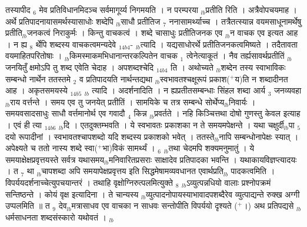 \documentclass[article,12pt,a4paper]{memoir}%
\newcommand{\add}[1]{($^{+}$#1)}
\newcounter{parCount}
\begin{document}
	  
	  \pstart \leavevmode%
	तस्यापीद {\tiny $_{6}$} मेव प्रतिविधानमिदञ्च सर्वमागूर्य्य निगमयति । न {\color{DodgerBlue3}परम्परया {\tiny $_{lb}$}प्रतीति} रिति । अत्रैवोपचयमाह । अर्थे प्रतिपादनायासमर्थस्यासाधोः शब्देपि {\tiny $_{lb}$}साधौ प्रतीतिज {\tiny $_{7}$} ननासामर्थ्याच्च । तत्रैतत्स्यान्न वयमसाधूनामर्थेषु प्रतीति{\tiny $_{lb}$}जनकत्वं निराकुर्मः । किन्तु वाचकत्वं । शब्दे चासाधुः प्रतीतिजनक एव {\tiny $_{lb}$}न वाचक एव इत्यत आह । न {\color{DodgerBlue3}ह्य {\tiny $_{8}$} \leavevmode{} र्थेपि शब्दस्य वाचकत्वमन्यदेवे} {\tiny $_{14b4}$}- {\tiny $_{lb}$}त्यादि । यद्यसाधोरर्थे प्रतीतिजनकत्वमिष्यते । तदैतावता वयमाहितपरितोषाः । {\tiny $_{lb}$}किमस्माकमभिधानान्तरकल्पितेन वाचक {\tiny $_{1}$} त्वेनेत्याकूतं । नैव तर्ह्यसावर्थप्रतीतिं {\tiny $_{lb}$}जनयितुँ क्षमोऽपि तु शब्द एवेति चेदाह । {\color{DodgerBlue3}अपशब्दश्चेदि {\tiny $_{14b4}$} ति} । अथोच्यते {\tiny $_{lb}$}शब्देन तस्य स्वाभाविकः सम्बन्धो नार्थेन ततस्तमे {\tiny $_{2}$} व प्रतिपादयति नार्थन्तद्यथा {\tiny $_{lb}$}स्वभावतश्चक्षूरूपं प्रकाश\add{य}ति न शब्दादीनत आह । {\color{DodgerBlue3}अकृतसमयस्ये {\tiny $_{14b5}$} {\tiny $_{lb}$} त्यादि} । अदर्शनादिति । न ह्यप्रतीतसम्बन्धाः {\color{DodgerBlue3}सिंहल} शब्दा आर्य {\tiny $_{3}$} जनव्यवहा{\tiny $_{lb}$}राय वर्त्तन्ते । समय एव तु जनयेत् प्रतीतिं । सामयिके च तत्र सम्बन्धे सोर्थेप्य{\tiny $_{lb}$}निवार्यः । समयवसादसाधुः साधौ वर्त्तमानोर्थ एव गवादौ {\tiny $_{4}$} किन्न {\tiny $_{lb}$}प्रवर्तते । नहि किञ्चित्तथा दोषो गुणस्तु केवल इत्याह । {\color{DodgerBlue3}एवं ही} त्या {\tiny $_{14b6}$} {\tiny $_{lb}$}दि । एतदुक्तम्भवति । ये स्वभावतः प्रकाशका न ते समयमपेक्षन्ते । यथा चक्षुर्दी{\tiny $_{lb}$}पा {\tiny $_{5}$} दयो रूपादीनां । स्वभावतश्चापशब्दो यदि शब्दस्य प्रकाशको भवेत् । ततस्ते{\tiny $_{lb}$}नापि सम्बन्धोनापेक्षः स्यात् । अपेक्ष्यते च ततो नास्य शब्दे स्वा\add{भा}विकं सामर्थ्यं । {\tiny $_{6}$} {\tiny $_{lb}$}तथा चेदमपि शक्यमनुमातुं । ये समयाक्षेक्षप्रवृत्तयस्ते सर्वत्र यथासमय{\tiny $_{lb}$}मनिवारितप्रसराः साक्षादेव प्रतिपादका भवन्ति । यथाकायविज्ञप्त्यादयः । त {\tiny $_{7}$} था {\tiny $_{lb}$}चापशब्दा अपि समयापेक्षप्रवृत्तय इति सिद्धमेषामव्यवधानत एवार्थप्रति{\tiny $_{lb}$} \leavevmode{} पादकत्वमिति । विपर्ययदर्शनाच्चेत्युपचयान्तरं । तथाहि वृक्षोग्निरुत्पलमित्युक्ते {\tiny $_{8}$} {\tiny $_{lb}$}ऽव्युत्पन्नधियो वालाः प्रश्नोपक्रमं सन्तिष्ठन्ते । कोयं वृक्ष इत्यादिना । ते चान्यस्य {\tiny $_{lb}$}व्युत्पादनोपायस्याभावादपशब्दैरेव व्युत्पाद्यन्ते रुक्ख अग्गी उप्पलमिति ॥ त {\tiny $_{9}$} \leavevmode{} देव{\tiny $_{lb}$}मत्रासाधव एव वाचका न साधवः सन्तोपीति विपर्ययो दृश्यते \add{।} अथ प्रतिपद्यसे {\tiny $_{lb}$}धर्मसाधनता शब्दसंस्कारो यथोवतं ।
	{}
	\pend%
      {\tiny $_{lb}$}
\end{document}
